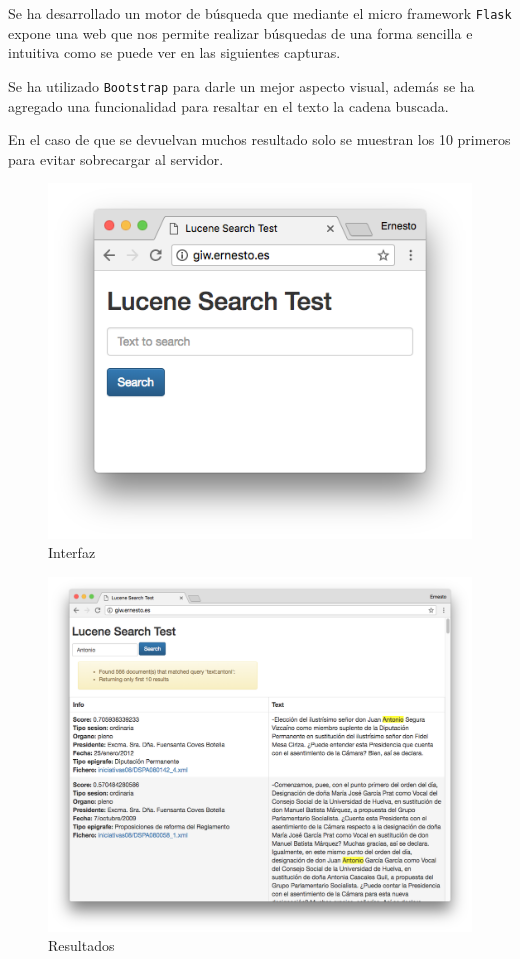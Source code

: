 Se ha desarrollado un motor de búsqueda que mediante el micro framework \texttt{Flask} expone una web que nos permite realizar búsquedas de una forma sencilla e intuitiva como se puede ver en las siguientes capturas.

Se ha utilizado \texttt{Bootstrap} para darle un mejor aspecto visual, además se ha agregado una funcionalidad para resaltar en el texto la cadena buscada.

En el caso de que se devuelvan muchos resultado solo se muestran los 10 primeros para evitar sobrecargar al servidor.

\begin{figure}
\centering
\includegraphics[width=1.0\textwidth]{../images/interface1.png}
\caption{Interfaz}
\end{figure}

\begin{figure}
\centering
\includegraphics[width=1.1\textwidth]{../images/results1.png}
\caption{Resultados}
\end{figure}







